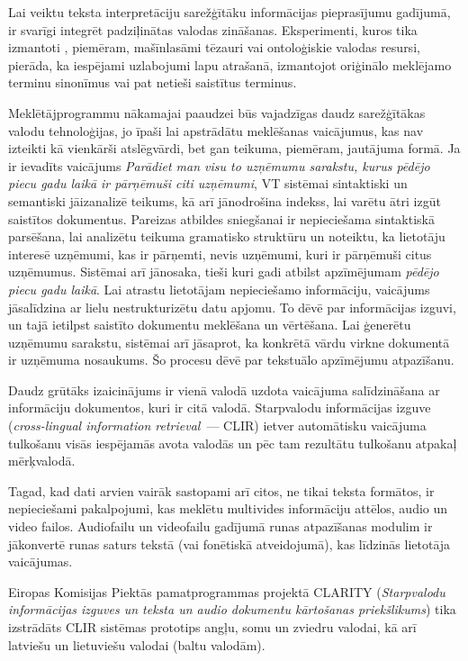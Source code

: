\begin{multicols}{2}
Lai veiktu teksta interpretāciju sarežģītāku informācijas pieprasījumu gadījumā, ir svarīgi integrēt padziļinātas valodas zināšanas.
Eksperimenti, kuros tika izmantoti , piemēram, mašīnlasāmi tēzauri vai ontoloģiskie valodas resursi, pierāda, ka iespējami uzlabojumi lapu atrašanā, izmantojot oriģinālo meklējamo terminu sinonīmus vai pat netieši saistītus terminus. 


Meklētājprogrammu nākamajai paaudzei būs vajadzīgas daudz sarežģītākas valodu tehnoloģijas, jo īpaši lai apstrādātu meklēšanas vaicājumus, kas nav izteikti kā vienkārši atslēgvārdi, bet gan teikuma, piemēram, jautājuma formā.
Ja ir ievadīts vaicājums \textit{Parādiet man visu to uzņēmumu sarakstu, kurus pēdējo piecu gadu laikā ir pārņēmuši citi uzņēmumi}, VT sistēmai sintaktiski un semantiski jāizanalizē teikums, kā arī jānodrošina indekss, lai varētu ātri izgūt saistītos dokumentus.
Pareizas atbildes sniegšanai ir nepieciešama sintaktiskā parsēšana, lai analizētu teikuma gramatisko struktūru un noteiktu, ka lietotāju interesē uzņēmumi, kas ir pārņemti, nevis uzņēmumi, kuri ir pārņēmuši citus uzņēmumus.
Sistēmai arī jānosaka, tieši kuri gadi atbilst apzīmējumam \textit{pēdējo piecu gadu laikā}.
Lai atrastu lietotājam nepieciešamo informāciju, vaicājums jāsalīdzina ar lielu nestrukturizētu datu apjomu.
To dēvē par informācijas izguvi, un tajā ietilpst saistīto dokumentu meklēšana un vērtēšana.
Lai ģenerētu uzņēmumu sarakstu, sistēmai arī jāsaprot, ka konkrētā vārdu virkne dokumentā ir uzņēmuma nosaukums.
Šo procesu dēvē par tekstuālo apzīmējumu atpazīšanu.

Daudz grūtāks izaicinājums ir vienā valodā uzdota vaicājuma salīdzināšana ar informāciju dokumentos, kuri ir citā valodā.
Starpvalodu informācijas izguve (\textit{cross-lingual information retrieval}~--- CLIR) ietver automātisku vaicājuma tulkošanu visās iespējamās avota valodās un pēc tam rezultātu tulkošanu atpakaļ mērķvalodā. 

Tagad, kad dati arvien vairāk sastopami arī citos, ne tikai teksta formātos, ir nepieciešami pakalpojumi, kas meklētu multivides informāciju attēlos, audio un video failos.
Audiofailu un videofailu gadījumā runas atpazīšanas modulim ir jākonvertē runas saturs tekstā (vai fonētiskā atveidojumā), kas līdzinās lietotāja vaicājumas. 

Eiropas Komisijas Piektās pamatprogrammas projektā CLARITY (\textit{Starpvalodu informācijas izguves un teksta un audio dokumentu kārtošanas priekšlikums}) tika izstrādāts CLIR sistēmas prototips angļu, somu un zviedru valodai, kā arī latviešu un lietuviešu valodai (baltu valodām).


\end{multicols}
